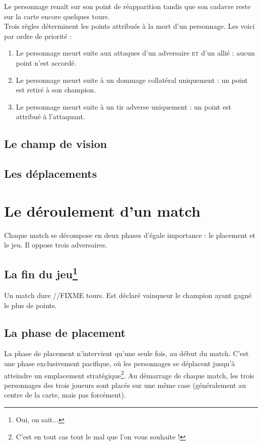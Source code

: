 Le personnage renaît sur son point de réapparition tandis que son cadavre reste sur la carte encore quelques tours.\\

Trois règles déterminent les points attribués à la mort d'un
personnage. Les voici par ordre de priorité :

\begin{enumerate}
\item Le personnage meurt suite aux attaques d'un adversaire
  \textsc{et} d'un allié : aucun point n'est accordé.
\item Le personnage meurt suite à un dommage collatéral uniquement : un point est
  retiré à son champion.
\item Le personnage meurt suite à un tir adverse uniquement : un point
  est attribué à l'attaquant.
\end{enumerate}

\subsection{Le champ de vision}


\subsection{Les déplacements}

\newpage
\section{Le déroulement d'un match}

Chaque match se décompose en deux phases d'égale importance : le
placement et le jeu. Il oppose trois adversaires.

\subsection[La fin du jeu]{La fin du jeu\protect\footnote{Oui, on sait...}}

Un match dure //FIXME tours. Est déclaré vainqueur le champion ayant
gagné le plus de points.

\subsection{La phase de placement}
La phase de placement n'intervient qu'une seule fois, au début du
match. C'est une phase exclusivement pacifique, où les personnages se
déplacent jusqu'à atteindre un emplacement stratégique\footnote{C'est
  en tout cas tout le mal que l'on vous souhaite !}.
Au démarrage de chaque match, les trois personnages des trois joueurs
sont placés sur une même case (généralement au centre de la carte,
mais pas forcément).

